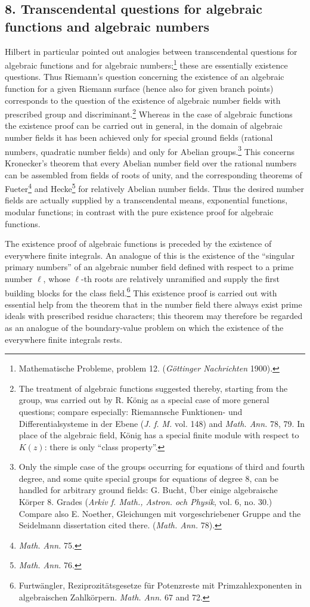 \documentclass[11pt]{article}
\begin{document}
\subsection*{8. Transcendental questions for algebraic functions and algebraic numbers}
Hilbert in particular pointed out analogies between transcendental questions for algebraic functions and for algebraic numbers;\footnote{Mathematische Probleme, problem 12. (\emph{Göttinger Nachrichten} 1900).} these are essentially existence questions. Thus Riemann's question concerning the existence of an algebraic function for a given Riemann surface (hence also for given branch points) corresponds to the question of the existence of algebraic number fields with prescribed group and discriminant.\footnote{The treatment of algebraic functions suggested thereby, starting from the group, was carried out by R. König as a special case of more general questions; compare especially: Riemannsche Funktionen- und Differentialsysteme in der Ebene (\emph{J. f. M.} vol. 148) and \emph{Math. Ann.} 78, 79. In place of the algebraic field, König has a special finite module with respect to \(K(z)\): there is only ``class property''.} Whereas in the case of algebraic functions the existence proof can be carried out in general, in the domain of algebraic number fields it has been achieved only for special ground fields (rational numbers, quadratic number fields) and only for Abelian groups.\footnote{Only the simple case of the groups occurring for equations of third and fourth degree, and some quite special groups for equations of degree 8, can be handled for arbitrary ground fields: G. Bucht, Über einige algebraische Körper 8. Grades (\emph{Arkiv f. Math., Astron. och Physik}, vol. 6, no. 30.) Compare also E. Noether, Gleichungen mit vorgeschriebener Gruppe and the Seidelmann dissertation cited there. (\emph{Math. Ann.} 78).} This concerns Kronecker's theorem that every Abelian number field over the rational numbers can be assembled from fields of roots of unity, and the corresponding theorems of Fueter\footnote{\emph{Math. Ann.} 75.} and Hecke\footnote{\emph{Math. Ann.} 76.} for relatively Abelian number fields. Thus the desired number fields are actually supplied by a transcendental means, exponential functions, modular functions; in contrast with the pure existence proof for algebraic functions.

The existence proof of algebraic functions is preceded by the existence of everywhere finite integrals. An analogue of this is the existence of the ``singular primary numbers'' of an algebraic number field defined with respect to a prime number \(\ell\), whose \(\ell\)-th roots are relatively unramified and supply the first building blocks for the class field.\footnote{Furtwängler, Reziprozitätsgesetze für Potenzreste mit Primzahlexponenten in algebraischen Zahlkörpern. \emph{Math. Ann.} 67 and 72.} This existence proof is carried out with essential help from the theorem that in the number field there always exist prime ideals with prescribed residue characters; this theorem may therefore be regarded as an analogue of the boundary-value problem on which the existence of the everywhere finite integrals rests.
\end{document}
